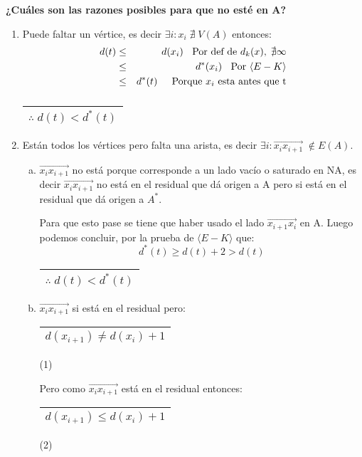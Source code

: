 \documentclass[12pt,a4paper]{report}
\newcounter{neq}
\begin{document}
			\vspace{5mm}
			\textbf{¿Cuáles son las razones posibles para que no esté en A?}
				\begin{enumerate}
					\item Puede faltar un vértice, es decir $\exists i : x_{i} \; \nexists \; V(A)$ entonces:
						\begin{eqnarray}
							\nonumber d(t) &\leq & d(x_{i}) \; \; \textup{ Por def de } d_{k}(x), \; \nexists \infty \\
							\nonumber &\leq & d^{*}(x_{i}) \; \; \textup { Por } \langle E-K \rangle \\
							\nonumber &\leq & d^{*}(t) \; \; \; \; \textup{ Porque } x_{i} \textup{ esta antes que t}
						\end{eqnarray}
						$\qquad\qquad\qquad\qquad\;$
						\begin{tabular}{|c|} \hline $\therefore \; d(t) < d^{*}(t)$ \\\hline \end{tabular}
					\item Están todos los vértices pero falta una arista, es decir $\exists i : \overrightarrow{x_{i}x_{i + 1}} \; \notin E(A)$.
						\begin{enumerate}[a)]
							\item $\overrightarrow{x_{i}x_{i + 1}}$ no está porque corresponde a un lado vacío o saturado en NA, es decir $\overrightarrow{x_{i}x_{i + 1}}$ no está en el residual que dá origen a A pero si está en el residual que dá origen a $A^{*}$.
								\par Para que esto pase se tiene que haber usado el lado $\overrightarrow{x_{i + 1}x_{i}}$ en A. Luego podemos concluir, por la prueba de $\langle E-K\rangle$ que:
								\[ d^{*}(t) \geq d(t) + 2 > d(t) \]
								$\qquad\qquad\qquad\qquad\qquad\qquad$
								\begin{tabular}{|c|} \hline $\therefore \; d(t) < d^{*}(t)$ \\\hline \end{tabular}
							\item $\overrightarrow{x_{i}x_{i + 1}}$ si está en el residual pero:
								\begin{tabular}{|c|} \hline $d(x_{i+1}) \neq d(x_{i}) +1 $ \\ \hline \end{tabular} (1)

								\vspace{5mm}
								\par Pero como $\overrightarrow{x_{i}x_{i + 1}}$ está en el residual entonces:
								\begin{tabular}{|c|} \hline $d(x_{i+1}) \leq d(x_{i}) +1 $ \\ \hline \end{tabular} (2)


\end{enumerate}
\end{enumerate}
\end{document}

